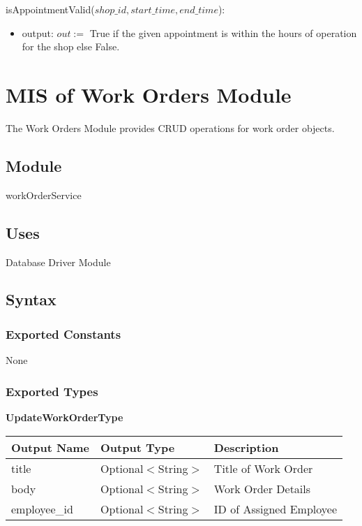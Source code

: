 \documentclass[12pt, titlepage]{article}
\begin{document}
\noindent isAppointmentValid($shop\_id, start\_time, end\_time$):
\begin{itemize}
	\item output: $out :=$ True if the given appointment is within the hours of operation for the shop else
	      False.
\end{itemize}

\newpage

\section{MIS of Work Orders Module} \label{mWorkOrders}

The Work Orders Module provides CRUD operations for work order objects.

\subsection{Module}

workOrderService

\subsection{Uses}

Database Driver Module

\subsection{Syntax}

\subsubsection{Exported Constants}

None

\subsubsection{Exported Types}

\textbf{UpdateWorkOrderType}

\begin{table}[H]
	\begin{tabular}{|p{}|p{}|p{}|}
		\hline
		\textbf{Output Name} & \textbf{Output Type} & \textbf{Description}    \\
		\hline
		title                & Optional$<$String$>$ & Title of Work Order     \\
		\hline
		body                 & Optional$<$String$>$ & Work Order Details      \\
		\hline
		employee\_id         & Optional$<$String$>$ & ID of Assigned Employee \\
		\hline
	\end{tabular}
\end{table}
\end{document}
